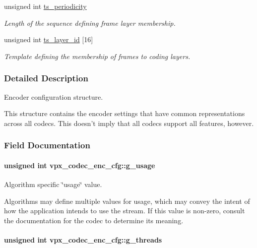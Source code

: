 \begin{DoxyCompactItemize}
unsigned int \hyperlink{structvpx__codec__enc__cfg_a4ec338780115dd270acf0dac24193474}{ts\-\_\-periodicity}
\begin{DoxyCompactList}\small\item\em \-Length of the sequence defining frame layer membership. \end{DoxyCompactList}\item 
unsigned int \hyperlink{structvpx__codec__enc__cfg_a4d105d2470dbfb7210b33d298f1cf1f6}{ts\-\_\-layer\-\_\-id} \mbox{[}16\mbox{]}
\begin{DoxyCompactList}\small\item\em \-Template defining the membership of frames to coding layers. \end{DoxyCompactList}\end{DoxyCompactItemize}


\subsubsection{\-Detailed \-Description}
\-Encoder configuration structure. 

\-This structure contains the encoder settings that have common representations across all codecs. \-This doesn't imply that all codecs support all features, however. 

\subsubsection{\-Field \-Documentation}
\hypertarget{structvpx__codec__enc__cfg_a5bcf7fc1efc4890de351e3c6fe252355}{
\paragraph[{g\-\_\-usage}]{\setlength{\rightskip}{0pt plus 5cm}unsigned int {\bf vpx\-\_\-codec\-\_\-enc\-\_\-cfg\-::g\-\_\-usage}}}
\label{structvpx__codec__enc__cfg_a5bcf7fc1efc4890de351e3c6fe252355}


\-Algorithm specific \char`\"{}usage\char`\"{} value. 

\-Algorithms may define multiple values for usage, which may convey the intent of how the application intends to use the stream. \-If this value is non-\/zero, consult the documentation for the codec to determine its meaning. \hypertarget{structvpx__codec__enc__cfg_aff9d8d458c45c95dd542603210ba2b8b}{
\paragraph[{g\-\_\-threads}]{\setlength{\rightskip}{0pt plus 5cm}unsigned int {\bf vpx\-\_\-codec\-\_\-enc\-\_\-cfg\-::g\-\_\-threads}}}
\label{structvpx__codec__enc__cfg_aff9d8d458c45c95dd542603210ba2b8b}


